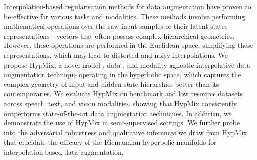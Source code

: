 Interpolation-based regularisation methods for data augmentation have proven to be effective for various tasks and modalities. These methods involve performing mathematical operations over the raw input samples or their latent states representations - vectors that often possess complex hierarchical geometries. However, these operations are performed in the Euclidean space, simplifying these representations, which may lead to distorted and noisy interpolations. We propose HypMix, a novel model-, data-, and modality-agnostic interpolative data augmentation technique operating in the hyperbolic space, which captures the complex geometry of input and hidden state hierarchies better than its contemporaries. We evaluate HypMix on benchmark and low resource datasets across speech, text, and vision modalities, showing that HypMix consistently outperforms state-of-the-art data augmentation techniques. In addition, we demonstrate the use of HypMix in semi-supervised settings. We further probe into the adversarial robustness and qualitative inferences we draw from HypMix that elucidate the efficacy of the Riemannian hyperbolic manifolds for interpolation-based data augmentation.
